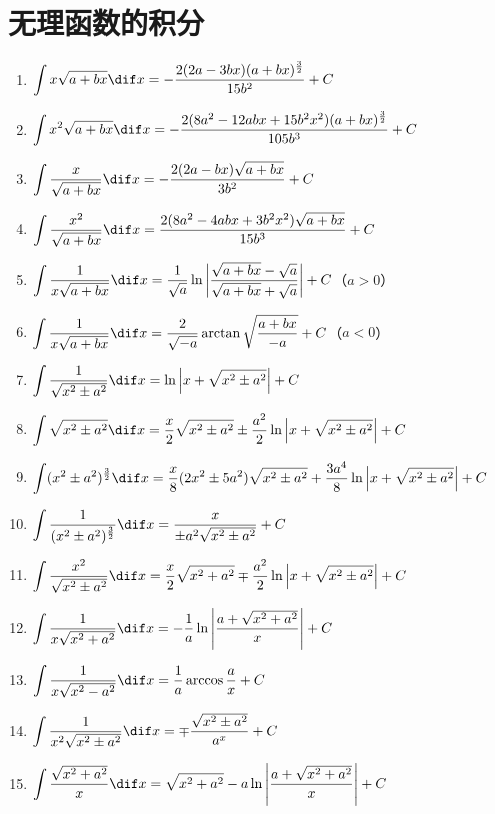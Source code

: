 \section*{无理函数的积分}
\begin{enumerate}[1.,itemsep=5pt,resume]
  \item $\displaystyle \int x\sqrt{a+bx}\dif x=-\frac{2(2a-3bx)(a+bx)^{\frac{3}{2}}}{15b^2} +C$
  \item $\displaystyle \int x^2\sqrt{a+bx}\dif x=-\frac{2(8a^2-12abx+15b^2x^2)(a+bx)^{\frac{3}{2}}}{105b^3} +C$
  \item $\displaystyle \int \frac{x}{\sqrt{a+bx}}\dif x =-\frac{2(2a-bx)\sqrt{a+bx}}{3b^2} +C$
  \item $\displaystyle \int \frac{x^2}{\sqrt{a+bx}}\dif x =\frac{2(8a^2-4abx+3b^2x^2)\sqrt{a+bx}}{15b^3} +C$
  \item $\displaystyle \int \frac{1}{x\sqrt{a+bx}}\dif x =\frac{1}{\sqrt{a}}\ln\left|\frac{\sqrt{a+bx}-\sqrt{a}}{\sqrt{a+bx}+\sqrt{a}}\right|+C$（$a>0$）
  \item $\displaystyle \int \frac{1}{x\sqrt{a+bx}}\dif x =\frac{2}{\sqrt{-a}}\arctan\sqrt{\frac{a+bx}{-a}}+C$（$a<0$）
  \item $\displaystyle \int \frac{1}{\sqrt{x^2\pm a^2}}\dif x = \ln\left|x+\sqrt{x^2\pm a^2}\right|+C$
  \item $\displaystyle \int \sqrt{x^2\pm a^2}\dif x =\frac{x}{2}\sqrt{x^2\pm a^2}\pm\frac{a^2}{2}\ln\left|x+\sqrt{x^2\pm a^2}\right| +C$
  \item $\displaystyle \int (x^2\pm a^2)^{\frac{3}{2}}\dif x =\frac{x}{8}(2x^2\pm5a^2)\sqrt{x^2\pm a^2}+\frac{3a^4}{8}\ln\left|x+\sqrt{x^2\pm a^2}\right| +C$
  \item $\displaystyle \int \frac{1}{(x^2\pm a^2)^{\frac{3}{2}}}\dif x =\frac{x}{\pm a^2\sqrt{x^2\pm a^2}} +C$
  \item $\displaystyle \int \frac{x^2}{\sqrt{x^2\pm a^2}}\dif x =\frac{x}{2}\sqrt{x^2+a^2}\mp\frac{a^2}{2}\ln\left|x+\sqrt{x^2\pm a^2}\right| +C$
  \item $\displaystyle \int \frac{1}{x\sqrt{x^2+a^2}}\dif x =-\frac{1}{a}\ln\left|\frac{a+\sqrt{x^2+a^2}}{x}\right| +C$
  \item $\displaystyle \int \frac{1}{x\sqrt{x^2-a^2}}\dif x =\frac{1}{a}\arccos\frac{a}{x} +C$
  \item $\displaystyle \int \frac{1}{x^2\sqrt{x^2\pm a^2}}\dif x =\mp\frac{\sqrt{x^2\pm a^2}}{a^x} +C$
  \item $\displaystyle \int \frac{\sqrt{x^2+a^2}}{x}\dif x =\sqrt{x^2+a^2}-a\ln\left|\frac{a+\sqrt{x^2+a^2}}{x}\right| +C$

\end{enumerate}
